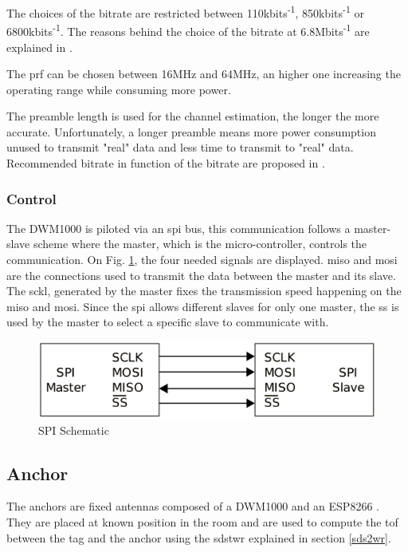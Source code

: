 The choices of the bitrate are restricted between 110kbits\textsuperscript{-1}, 850kbits\textsuperscript{-1} or 6800kbits\textsuperscript{-1}. The reasons behind the choice of the bitrate at 6.8Mbits\textsuperscript{-1} are explained in \cite{hannotier2019indoor}.
\vspace{2mm}

The \gls{prf} can be chosen between 16MHz and 64MHz, an higher one increasing the operating range while consuming more power.
\vspace{2mm}

The preamble length is used for the channel estimation, the longer the more accurate. Unfortunately, a longer preamble means more power consumption unused to transmit "real" data and less time to transmit to "real" data. Recommended bitrate in function of the bitrate are proposed in \cite{usermanual}.
\vspace{2mm}

\subsubsection{Control}

The DWM1000 is piloted via an \gls{spi} bus, this communication follows a master-slave scheme where the master, which is the micro-controller, controls the communication\cite{busspi}. On Fig. \ref{fig:spi_scheme}, the four needed signals are displayed. \gls{miso} and \gls{mosi} are the connections used to transmit the data between the master and its slave.
The \gls{sckl}, generated by the master fixes the transmission speed happening on the \gls{miso} and \gls{mosi}.  Since the \gls{spi} allows different slaves for only one master, the \gls{ss} is used by the master to select a specific slave to communicate with. 

\begin{figure}[H]
	\centering
	\includegraphics[width=.6\linewidth]{Images/SPI_scheme.png}
	\caption{SPI Schematic}
	\label{fig:spi_scheme}
\end{figure}

\subsection{Anchor}

The anchors are fixed antennas composed of a DWM1000 and an ESP8266 \cite{esp8266}. They are placed at known position in the room and are used to compute the \gls{tof} between the tag and the anchor using the \gls{sdstwr} explained in section \ref{sds2wr}. 

